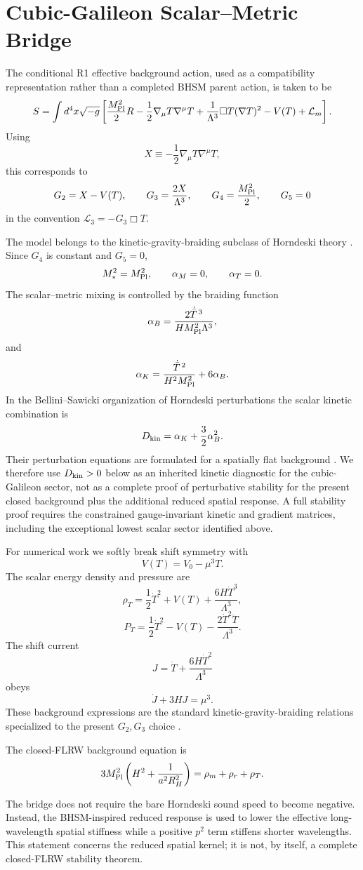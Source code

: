 
\section{Cubic-Galileon Scalar--Metric Bridge}

The conditional R1 effective background action, used as a compatibility representation rather than a completed BHSM parent action, is taken to be
\[
S=
\int d^4x\sqrt{-g}
\left[
\frac{M_{\rm Pl}^2}{2}R
-\frac12\nabla_\mu T\nabla^\mu T
+\frac{1}{\Lambda^3}\Box T(\nabla T)^2
-V(T)
+\mathcal L_m
\right].
\]
Using
\[
X\equiv-\frac12\nabla_\mu T\nabla^\mu T,
\]
this corresponds to
\[
G_2=X-V(T),\qquad
G_3=\frac{2X}{\Lambda^3},\qquad
G_4=\frac{M_{\rm Pl}^2}{2},\qquad
G_5=0
\]
in the convention \(\mathcal L_3=-G_3\Box T\).

The model belongs to the kinetic-gravity-braiding subclass of Horndeski theory \citep{DeffayetKGB2010,BelliniSawicki2014}. Since \(G_4\) is constant and \(G_5=0\),
\[
M_*^2=M_{\rm Pl}^2,\qquad
\alpha_M=0,\qquad
\alpha_T=0.
\]
The scalar--metric mixing is controlled by the braiding function
\[
\alpha_B
=
\frac{2\dot{\bar T}^{\,3}}
{HM_{\rm Pl}^2\Lambda^3},
\]
and
\[
\alpha_K
=
\frac{\dot{\bar T}^{\,2}}
{H^2M_{\rm Pl}^2}
+
6\alpha_B.
\]
In the Bellini--Sawicki organization of Horndeski perturbations the scalar kinetic combination is
\[
D_{\rm kin}
=
\alpha_K+\frac32\alpha_B^2.
\]
Their perturbation equations are formulated for a spatially flat background \citep{BelliniSawicki2014}. We therefore use \(D_{\rm kin}>0\) below as an inherited kinetic diagnostic for the cubic-Galileon sector, not as a complete proof of perturbative stability for the present closed background plus the additional reduced spatial response. A full stability proof requires the constrained gauge-invariant kinetic and gradient matrices, including the exceptional lowest scalar sector identified above.

For numerical work we softly break shift symmetry with
\[
V(T)=V_0-\mu^3T.
\]
The scalar energy density and pressure are
\[
\rho_T
=
\frac12\dot T^2+V(T)
+\frac{6H\dot T^3}{\Lambda^3},
\]
\[
P_T
=
\frac12\dot T^2-V(T)
-\frac{2\dot T^2\ddot T}{\Lambda^3}.
\]
The shift current
\[
J=\dot T+\frac{6H\dot T^2}{\Lambda^3}
\]
obeys
\[
\dot J+3HJ=\mu^3.
\]
These background expressions are the standard kinetic-gravity-braiding relations specialized to the present \(G_2,G_3\) choice \citep{DeffayetKGB2010}.

The closed-FLRW background equation is
\[
3M_{\rm Pl}^2
\left(
H^2+\frac{1}{a^2R_H^2}
\right)
=
\rho_m+\rho_r+\rho_T.
\]

The bridge does not require the bare Horndeski sound speed to become negative. Instead, the BHSM-inspired reduced response is used to lower the effective long-wavelength spatial stiffness while a positive \(p^2\) term stiffens shorter wavelengths. This statement concerns the reduced spatial kernel; it is not, by itself, a complete closed-FLRW stability theorem.
